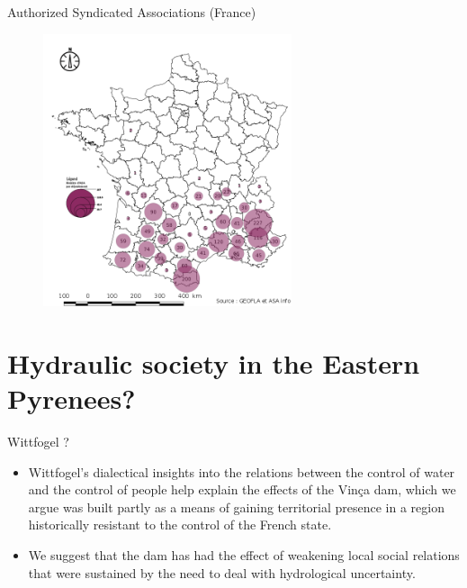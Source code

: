 \documentclass[newPxFont]{beamer}
\begin{document}
\begin{frame}[c]{Authorized Syndicated Associations (France)}
\vspace{-3em}
\begin{figure}
	\centering
	\includegraphics[width = 0.65\textwidth]{img/nbASA_dep}
\end{figure}
\end{frame}



\section{Hydraulic society in the Eastern Pyrenees?}



\begin{frame}[c]{Wittfogel ? }
\begin{itemize}
	\item Wittfogel’s dialectical insights into the relations between the control of water and the control of people help explain the effects of the Vinça dam, which we argue was built partly as a means of gaining territorial presence in a region historically resistant to the control of the French state.
	\item We suggest that the dam has had the effect of weakening local social relations that were sustained by the need to deal with hydrological uncertainty.
\end{itemize}
\end{frame}
\end{document}
